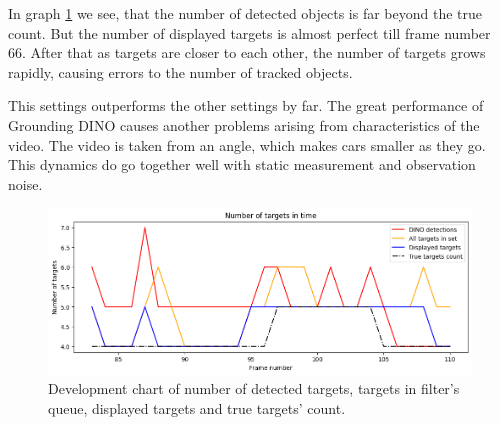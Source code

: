 In graph \ref{gr:E1-V2-S3} we see, that the number of detected objects is far beyond the true count. But the number
of displayed targets is almost perfect till frame number 66. After that as targets are closer to each other, the number of targets grows rapidly, causing errors to the number of tracked objects.

This settings outperforms the other settings by far. The great performance of Grounding DINO causes another problems arising from characteristics of the video. The video is taken from an angle, which makes cars smaller as they go. This dynamics do go together well with static measurement and observation noise.

\begin{figure}[H]
    \centering
    \includegraphics[width=\linewidth]{../../../experiments/E1/V2/DINO/dino_det}
    \caption{Development chart of number of detected targets, targets in filter's queue, displayed targets and true targets' count.}
    \label{gr:E1-V2-S3}
\end{figure}

